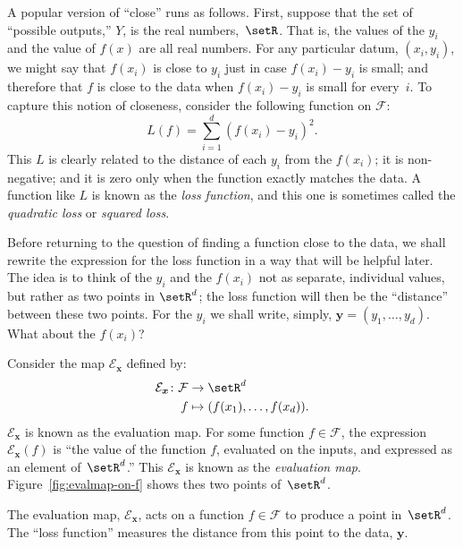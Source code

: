 \documentclass[10pt, a4paper]{article}
\begin{document}
A popular version of “close” runs as follows. First, suppose that the
set of “possible outputs,” $Y$, is the real numbers,~$\setR$. That is,
the values of the $y_i$ and the value of $f(x)$ are all real
numbers. For any particular datum, $(x_i, y_i)$, we might say that
$f(x_i)$ is close to $y_i$ just in case $ f(x_i)-y_i $ is small; and
therefore that $f$ is close to the data when $f(x_i)-y_i$ is small for
every~$i$. To capture this notion of closeness, consider the following
function on $\mathcal{F}$:
\begin{equation}
  \label{eq:square-loss}  
  L(f) = \sum_{i=1}^d{(f(x_i) - y_i)}^2.
\end{equation}
This $L$ is clearly related to the distance of each $y_i$ from the
$f(x_i)$; it is non-negative; and it is zero only when the function
exactly matches the data. A function like $L$ is known as the
\emph{loss function}, and this one is sometimes called the
\emph{quadratic loss} or \emph{squared loss}.

Before returning to the question of finding a function close to the
data, we shall rewrite the expression for the loss function in a way
that will be helpful later. The idea is to think of the $y_i$ and the
$f(x_i)$ not as separate, individual values, but rather as two points
in $\setR^d$; the loss function will then be the “distance” between
these two points. For the $y_i$ we shall write, simply,
$\bm{y}=(y_1,\dotsc,y_d)$. What about the $f(x_i)$?

Consider the map $\mathcal{E}_{\bm{x}}$ defined by:
\[
  \begin{aligned}
    \mathcal{E}_{\bm{x}} \colon \mathcal{F} &\to \setR^d \\
    f &\mapsto (f(x_1), \dotsc, f(x_d)).
  \end{aligned}
\]
$\mathcal{E}_{\bm{x}}$ is known as the evaluation map. For some function $f\in\mathcal{F}$, the expression
$\mathcal{E}_{\bm{x}}(f)$ is “the value of the function $f$, evaluated on the
inputs, and expressed as an element of~$\setR^d$.” This
$\mathcal{E}_{\bm{x}}$ is known as the \emph{evaluation
  map}. Figure~\ref{fig:evalmap-on-f} shows thes two points
of~$\setR^d$.
\begin{marginfigure}
  \begin{center}
  \end{center}
  \caption{The evaluation map, $\mathcal{E}_{\bm{x}}$, acts on a function
    $f\in\mathcal{F}$ to produce a point in~$\setR^d$. The “loss function”
    measures the distance from this point to the data,
    $\bm{y}$.\label{fig:evalmap-on-f}}
\end{marginfigure}
\end{document}
